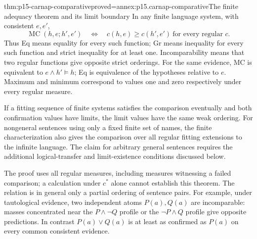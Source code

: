 \begin{hbtheorem}{thm:p15-carnap-comparative}{proved=annex:p15.carnap-comparative}{The finite adequacy theorem and its limit boundary}
In any finite language system, with consistent \(e,e'\),
\[
 \operatorname{MC}(h,e;h',e')
 \quad\Longleftrightarrow\quad
 c(h,e)\geq c(h',e')\ \text{for every regular }c.
\]
Thus Eq means equality for every such function; Gr means inequality for
every such function and strict inequality for at least one. Incomparability
means that two regular functions give opposite strict orderings.
For the same evidence, MC is equivalent to
\(e\land h'\models h\); Eq is equivalence of the hypotheses
relative to \(e\). Maximum and minimum correspond to values one and
zero respectively under every regular measure.

If a fitting sequence of finite systems satisfies the comparison
eventually and both confirmation values have limits, the limit values
have the same weak ordering. For nongeneral sentences using only a fixed
finite set of names, the finite characterization also gives the comparison
over all regular fitting extensions to the infinite language. The claim
for arbitrary general sentences requires the additional logical-transfer
and limit-existence conditions discussed below.
\end{hbtheorem}

The proof uses all regular measures, including measures witnessing a
failed comparison; a calculation under \(c^*\) alone cannot establish
this theorem. The relation is in general only a partial ordering of
sentence pairs. For example, under tautological evidence, two independent
atoms \(P(a),Q(a)\) are incomparable: masses concentrated near the
\(P\land\neg Q\) profile or the \(\neg P\land Q\) profile give
opposite predictions. In contrast \(P(a)\lor Q(a)\) is at least as
confirmed as \(P(a)\) on every common consistent evidence.

